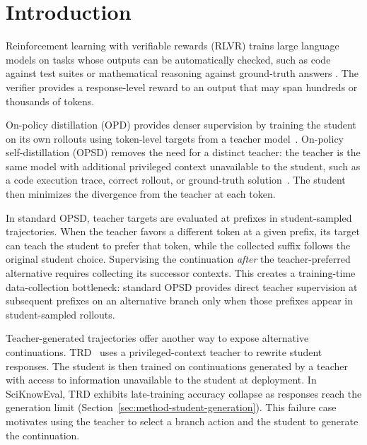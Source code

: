 \section{Introduction}
\label{sec:intro}

Reinforcement learning with verifiable rewards (RLVR) trains large language models on tasks whose outputs can be automatically checked, such as code against test suites or mathematical reasoning against ground-truth answers \citep{le2022coderl,shao2024deepseekmath,guo2025deepseekr1}. The verifier provides a response-level reward to an output that may span hundreds or thousands of tokens.

On-policy distillation (OPD) provides denser supervision by training the student on its own rollouts using token-level targets from a teacher model~\citep{agarwal2024opd}. On-policy self-distillation (OPSD) removes the need for a distinct teacher: the {teacher} is the same model with additional privileged context unavailable to the student, such as a code execution trace, correct rollout, or ground-truth solution~\citep{hubotter2026sdpo,zhao2026sdr,song2026rltf}. The student then minimizes the divergence from the teacher at each token.

In standard OPSD, teacher targets are evaluated at prefixes in student-sampled trajectories. When the teacher favors a different token at a given prefix, its target can teach the student to prefer that token, while the collected suffix follows the original student choice. Supervising the continuation \textit{after} the teacher-preferred alternative requires collecting its successor contexts. This creates a training-time data-collection bottleneck: standard OPSD provides direct teacher supervision at subsequent prefixes on an alternative branch only when those prefixes appear in student-sampled rollouts.

Teacher-generated trajectories offer another way to expose alternative continuations. TRD~\citep{jiang2026trajectory} uses a privileged-context teacher to rewrite student responses. The student is then trained on continuations generated by a teacher with access to information unavailable to the student at deployment. In SciKnowEval, TRD exhibits late-training accuracy collapse as responses reach the generation limit (Section~\ref{sec:method-student-generation}). This failure case motivates using the teacher to select a branch action and the student to generate the continuation.

